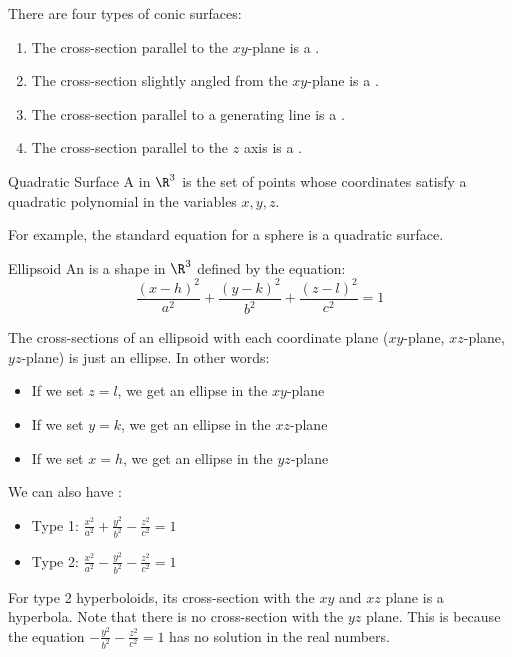 \documentclass[12pt]{report}
\begin{document}
There are four types of conic surfaces:
\begin{enumerate}[noitemsep]
    \item The cross-section parallel to the $xy$-plane is a .
    \item The cross-section slightly angled from the $xy$-plane is a .
    \item The cross-section parallel to a generating line is a .
    \item The cross-section parallel to the $z$ axis is a .
\end{enumerate}

\begin{dfnbox}{Quadratic Surface}{}
    A  in $\R^3$ is the set of points whose coordinates satisfy a quadratic polynomial in the variables $x,y,z$.
\end{dfnbox}

For example, the standard equation for a sphere is a quadratic surface.

\begin{dfnbox}{Ellipsoid}{}
    An  is a shape in $\R^3$ defined by the equation:
    \[ \frac{(x-h)^2}{a^2} + \frac{(y-k)^2}{b^2} + \frac{(z-l)^2}{c^2} = 1 \]
\end{dfnbox}

The cross-sections of an ellipsoid with each coordinate plane ($xy$-plane, $xz$-plane, $yz$-plane) is just an ellipse. In other words:
\begin{itemize}[noitemsep]
    \item If we set $z = l$, we get an ellipse in the $xy$-plane
    \item If we set $y = k$, we get an ellipse in the $xz$-plane
    \item If we set $x = h$, we get an ellipse in the $yz$-plane
\end{itemize}

We can also have :
\begin{itemize}
    \item Type 1: $\frac{x^2}{a^2} + \frac{y^2}{b^2} - \frac{z^2}{c^2} = 1$
    \item Type 2: $\frac{x^2}{a^2} - \frac{y^2}{b^2} - \frac{z^2}{c^2} = 1$
\end{itemize}

For type 2 hyperboloids, its cross-section with the $xy$ and $xz$ plane is a hyperbola. Note that there is no cross-section with the $yz$ plane. This is because the equation $- \frac{y^2}{b^2} - \frac{z^2}{c^2} = 1$ has no solution in the real numbers.

\makeamzindex
\end{document}
